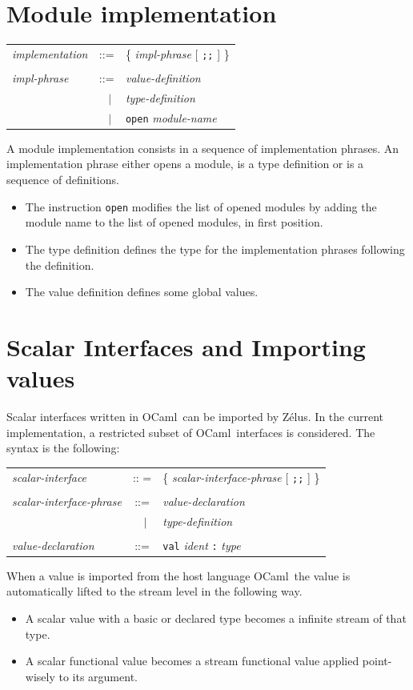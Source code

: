 \documentclass[11pt,titlepage,twoside]{report}
\newcommand{\zelus}{{\sf Z\'elus}}
\newcommand{\ocaml}{{\sf OCaml}}
\newcommand{\alt}{\;|\;}
\newcommand{\Semisemi}{\mbox{{\tt ;;}}}
\newcommand{\term}[1]{{\tt #1}}
\newcommand{\nterm}[1]{{\em #1}}
\begin{document}
\section{Module implementation}
\begin{center}
\begin{tabular}{lcl}
\nterm{implementation}
  & ::=        & \{ \nterm{impl-phrase} [ \term{;;} ] \} 
\\ \\
\nterm{impl-phrase}
  & ::=        & \nterm{value-definition} \\ 
  & $\;\;\alt$ & \nterm{type-definition} \\
  & $\;\;\alt$ & \term{open} \nterm{module-name} 
\end{tabular}
\end{center}
A module implementation consists in a sequence of implementation
phrases. An implementation phrase either opens a module, is a type
definition or is a sequence of definitions.
\begin{itemize}
\item The instruction \term{open} modifies the list of opened modules
  by adding the module name to the list of opened modules, in first
  position.
\item The type definition defines the type for the implementation
  phrases following the definition.
\item The value definition defines some global values.
\end{itemize}

\section{Scalar Interfaces and Importing values}
Scalar interfaces written in \ocaml\ can be imported by \zelus. In the
current implementation, a restricted subset of \ocaml\ interfaces is
considered. The syntax is the following:
\begin{center}
\begin{tabular}{lcl}
\nterm{scalar-interface}
  & :: =   & \{ \nterm{scalar-interface-phrase} [ \term{\Semisemi} ] \} 
\\ \\
\nterm{scalar-interface-phrase}
  & ::=        & \nterm{value-declaration} \\
  & $\;\;\alt$ & \nterm{type-definition}
\\ \\
\nterm{value-declaration}
  & ::=        & \term{val} \nterm{ident} \term{:} \nterm{type}
\end{tabular}
\end{center}
When a value is imported from the host language \ocaml\ the
value is automatically lifted to the stream level in the following way.
\begin{itemize}
\item A scalar value with a basic or declared type becomes a infinite
  stream of that type.
\item A scalar functional value becomes a stream functional value
  applied point-wisely to its argument.
\end{itemize}
\end{document}
